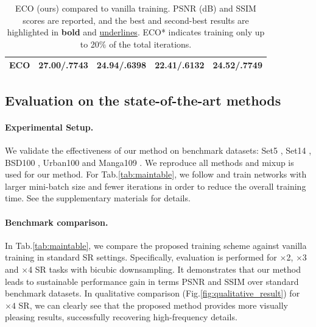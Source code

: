 \documentclass[letterpaper]{article} %
\begin{document}
\begin{table}[h]
\begin{tabular}{l|l|l|l|l}
ECO              & \textbf{27.00}/\textbf{.7743}             & \textbf{24.94}/\textbf{.6398}             & \textbf{22.41}/\textbf{.6132}             & \textbf{24.52}/\textbf{.7749}                 \\
\hline
\hline
%
%
\end{tabular}
\caption{ECO (ours) compared to vanilla training. PSNR (dB) and SSIM scores are reported, and the best and second-best results are highlighted in \textbf{bold} and \underline{underlines}. ECO* indicates training only up to 20$\%$ of the total iterations.}
\label{tab:ablation_table}
\end{table}



\subsection{Evaluation on the state-of-the-art methods}

\paragraph{Experimental Setup.}
We validate the effectiveness of our method on benchmark datasets: Set5 \cite{set5}, Set14 \cite{set14}, BSD100 \cite{bsd100}, Urban100 \cite{urban100} and Manga109 \cite{manga109}. 
We reproduce all methods and mixup is used for our method. For Tab.\ref{tab:maintable}, we follow \cite{rcanit} and train networks with larger mini-batch size and fewer iterations in order to reduce the overall training time. See the supplementary materials for details.
 
 



\paragraph{Benchmark comparison.}
In Tab.\ref{tab:maintable}, we compare the proposed training scheme against vanilla training in standard SR settings. Specifically, evaluation is performed for $\times$2, $\times$3 and $\times$4 SR tasks with bicubic downsampling. It demonstrates that our method leads to sustainable performance gain in terms PSNR and SSIM over standard benchmark datasets. In qualitative comparison (Fig.\ref{fig:qualitative_result}) for $\times 4$ SR, we can clearly see that the proposed method provides more visually pleasing results, successfully recovering high-frequency details. 
\end{document}

